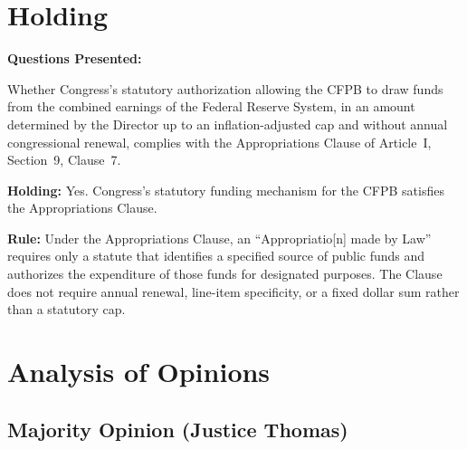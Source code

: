 \documentclass[12pt]{article}
\begin{document}
\section{Holding}
\textbf{Questions Presented:}

Whether Congress's statutory authorization allowing the CFPB to draw funds from the combined earnings of the Federal Reserve System, in an amount determined by the Director up to an inflation-adjusted cap and without annual congressional renewal, complies with the Appropriations Clause of Article~I, Section~9, Clause~7.

\textbf{Holding:} Yes. Congress's statutory funding mechanism for the CFPB satisfies the Appropriations Clause.

\textbf{Rule:} Under the Appropriations Clause, an ``Appropriatio[n] made by Law'' requires only a statute that identifies a specified source of public funds and authorizes the expenditure of those funds for designated purposes. The Clause does not require annual renewal, line-item specificity, or a fixed dollar sum rather than a statutory cap.

\section{Analysis of Opinions}
\subsection{Majority Opinion (Justice Thomas)}
\end{document}
